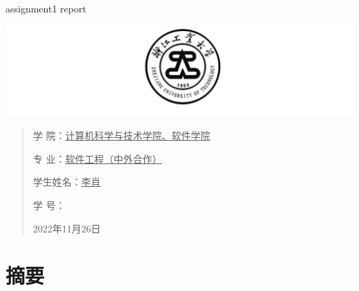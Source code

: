 \documentclass[UTF8]{ctexart}
\date{}
\begin{document}
\begin{center}
    \quad \\
    \quad \\
    \huge  assignment1 report
\end{center}
\vskip 3.5cm

\begin{center}
    \includegraphics[scale=0.6]{../img/logo.png}
\end{center}
\vskip 4.5cm

\begin{quotation}
    \songti \fontsize{15}{15}
    \doublespacing
    \par\setlength\parindent{9em}
    \quad

    学\hspace{0.61cm} 院：\underline{\quad 计算机科学与技术学院、软件学院}

    专\hspace{0.61cm} 业：\underline{\qquad 软件工程（中外合作）\qquad\qquad  }

    学生姓名：\underline{\qquad\qquad\qquad 李肖 \qquad\qquad\qquad\qquad }

    学\hspace{0.61cm} 号：\underline{\qquad{} \qquad\qquad\qquad}

    \vskip 1cm
    \centering
    2022年11月26日
\end{quotation}

\newpage
\section{摘要}
\end{document}
